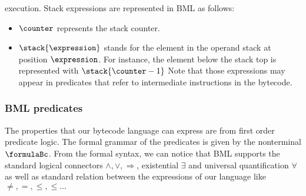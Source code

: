 execution. Stack expressions are represented in BML as follows:
\begin{itemize}
      \item  $\counter$ represents the stack counter.
      \item  $\stack{ \expression}$ stands for the element in the operand stack at position $\expression$.   
             For instance, the element below the stack top is represented with $\stack{\counter - 1}$ 
	     Note that those expressions may appear in predicates that refer to intermediate instructions in the bytecode. 
	   
 \end{itemize}


%
% 
%

\subsubsection{BML predicates}
 The properties that our bytecode language can express are from first order predicate logic. The formal grammar of the predicates is
 given by the nonterminal $\formulaBc$. From the formal syntax, we can notice that BML supports the standard logical connectors
 $\wedge, \vee, \Rightarrow $, existential $\exists$ and universal quantification $\forall$ as well as standard relation between
 the  expressions of our language like $\neq, = , \leq, \le \ldots$  
 


